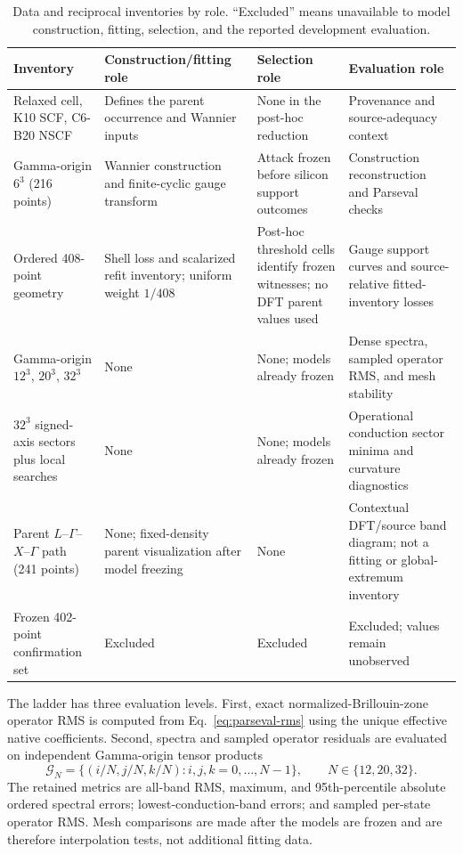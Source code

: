\documentclass[11pt]{article}
\theoremstyle{definition}
\begin{document}
\begin{table}[tbp]
\centering
\small
\caption{Data and reciprocal inventories by role.  ``Excluded'' means unavailable to
model construction, fitting, selection, and the reported development evaluation.}
\label{tab:data-roles}
\begin{tabularx}{\textwidth}{@{}p{}XXX@{}}
\toprule
Inventory & Construction/fitting role & Selection role & Evaluation role\\
\midrule
Relaxed cell, K10 SCF, C6-B20 NSCF
& Defines the parent occurrence and Wannier inputs
& None in the post-hoc reduction
& Provenance and source-adequacy context\\
Gamma-origin $6^3$ (216 points)
& Wannier construction and finite-cyclic gauge transform
& Attack frozen before silicon support outcomes
& Construction reconstruction and Parseval checks\\
Ordered 408-point geometry
& Shell loss and scalarized refit inventory; uniform weight $1/408$
& Post-hoc threshold cells identify frozen witnesses; no DFT parent values used
& Gauge support curves and source-relative fitted-inventory losses\\
Gamma-origin $12^3$, $20^3$, $32^3$
& None
& None; models already frozen
& Dense spectra, sampled operator RMS, and mesh stability\\
$32^3$ signed-axis sectors plus local searches
& None
& None; models already frozen
& Operational conduction sector minima and curvature diagnostics\\
Parent $L$--$\Gamma$--$X$--$\Gamma$ path (241 points)
& None; fixed-density parent visualization after model freezing
& None
& Contextual DFT/source band diagram; not a fitting or global-extremum inventory\\
Frozen 402-point confirmation set
& Excluded
& Excluded
& Excluded; values remain unobserved\\
\bottomrule
\end{tabularx}
\end{table}

The ladder has three evaluation levels.  First, exact normalized-Brillouin-zone operator
RMS is computed from Eq.~\eqref{eq:parseval-rms} using the unique effective native
coefficients.  Second, spectra and sampled operator residuals are evaluated on independent
Gamma-origin tensor products
\begin{equation}
 \mathcal G_N=\{(i/N,j/N,k/N):i,j,k=0,\ldots,N-1\},
 \qquad N\in\{12,20,32\}.
 \label{eq:dense-meshes}
\end{equation}
The retained metrics are all-band RMS, maximum, and 95th-percentile absolute ordered
spectral errors; lowest-conduction-band errors; and sampled per-state operator RMS.  Mesh
comparisons are made after the models are frozen and are therefore interpolation tests,
not additional fitting data.
\end{document}
